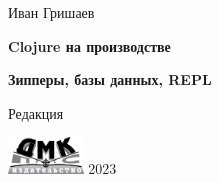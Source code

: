 
\begin{titlepage}

\begin{center}

  {Иван Гришаев}

  \vspace*{5cm}

  {\Large\textbf{Clojure на производстве}}

  \vspace{1mm}

  {\Large\textbf{Зипперы, базы данных, REPL}}

  \vspace{7mm}

  {\small Редакция \COMMITHASH}

  \vspace*{\fill}

  \ifdmk
    \includegraphics[width=20mm]{media/dmk_logo}%
  \else
    {2023}
  \fi

\end{center}

\end{titlepage}
